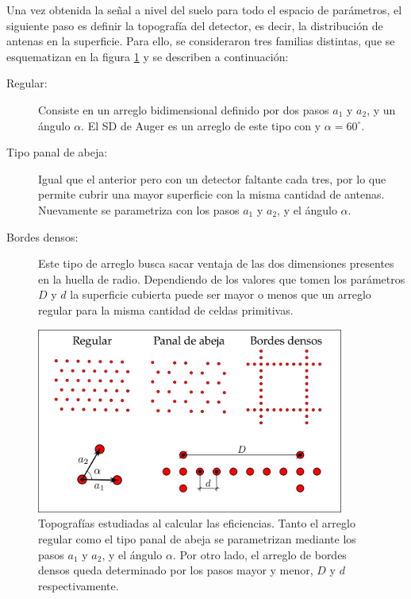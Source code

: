 	Una vez obtenida la se\~nal a nivel del suelo para todo el espacio de par\'ametros, el siguiente paso es definir la topograf\'ia del detector, es decir, la distribuci\'on de antenas en la superficie.
	Para ello, se consideraron tres familias distintas, que se esquematizan en la figura \ref{fig:topoRadio} y se describen a continuaci\'on:
	\begin{description}
	 \item[Regular:] Consiste en un arreglo bidimensional definido por dos pasos $a_1$ y $a_2$, y un \'angulo $\alpha$. El SD de Auger es un arreglo de este tipo con  y $\alpha=60^\circ$.
	 \item[Tipo panal de abeja:] Igual que el anterior pero con un detector faltante cada tres, por lo que permite cubrir una mayor superficie con la misma cantidad de antenas. Nuevamente se parametriza con los pasos $a_1$ y $a_2$, y el \'angulo $\alpha$. 
	 \item[Bordes densos:] Este tipo de arreglo busca sacar ventaja de las dos dimensiones presentes en la huella de radio. Dependiendo de los valores que tomen los par\'ametros $D$ y $d$ la superficie cubierta puede ser mayor o menos que un arreglo regular para la misma cantidad de celdas primitivas.  
	\end{description}
	\begin{figure}[h!]
		\begin{center}
			\includegraphics[width=0.9\textwidth]{fig/resultadosRadio/topografia}
			\caption{\label{fig:topoRadio} Topograf\'ias estudiadas al calcular las eficiencias. Tanto el arreglo regular como el tipo panal de abeja se parametrizan mediante los pasos $a_1$ y $a_2$, y el \'angulo $\alpha$. Por otro lado, el arreglo de bordes densos queda determinado por los pasos mayor y menor, $D$ y $d$ respectivamente.
			}
		\end{center}
	\end{figure}
	
